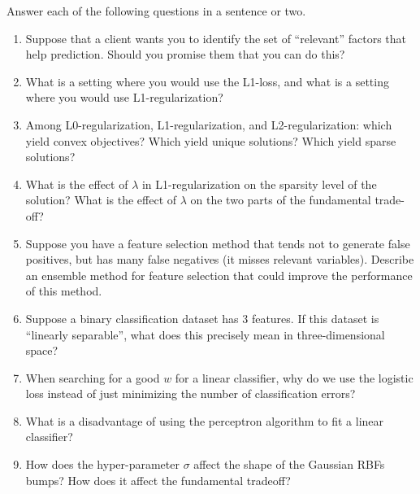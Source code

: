 \documentclass{article}
\newcommand{\blu}[1]{{\textcolor{blu}{#1}}}
\newcommand{\gre}[1]{\textcolor{gre}{#1}}
\newcommand\ans[1]{\par\gre{Answer: #1}}
\let\ask\blu
\begin{document}
\ask{Answer each of the following questions in a sentence or two.}
\begin{enumerate}

\item Suppose that a client wants you to identify the set of ``relevant'' factors that help prediction. Should you promise them that you can do this?

\item What is a setting where you would use the L1-loss, and what is a setting where you would use L1-regularization?

\item Among L0-regularization, L1-regularization, and L2-regularization: which yield convex objectives? Which yield unique solutions? Which yield sparse solutions?

\item What is the effect of $\lambda$ in L1-regularization on the sparsity level of the solution? What is the effect of $\lambda$ on the two parts of the fundamental trade-off?

\item Suppose you have a feature selection method that tends not to generate false positives, but has many false negatives (it misses relevant variables). Describe an ensemble method for feature selection that could improve the performance of this method.

\item Suppose a binary classification dataset has 3 features. If this dataset is ``linearly separable'', what does this precisely mean in three-dimensional space?

\item When searching for a good $w$ for a linear classifier, why do we use the logistic loss instead of just minimizing the number of classification errors?

\item What is a disadvantage of using the perceptron algorithm to fit a linear classifier?

\item How does the hyper-parameter $\sigma$ affect the shape of the Gaussian RBFs bumps? How does it affect the fundamental tradeoff?

\end{enumerate}

\end{document}
